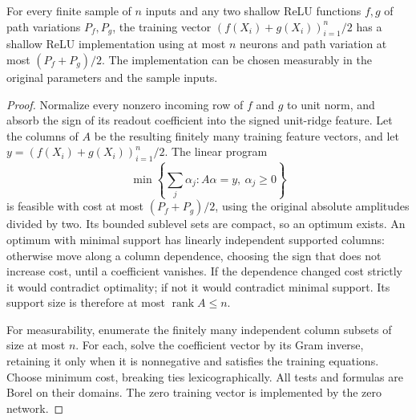 \begin{lemma}
For every finite sample of $n$ inputs and any two shallow ReLU
functions $f,g$ of path variations $P_f,P_g$, the training vector
$(f(X_i)+g(X_i))_{i=1}^n/2$ has a shallow ReLU implementation
using at most $n$ neurons and path variation at most $(P_f+P_g)/2$.
The implementation can be chosen measurably in the original
parameters and the sample inputs.
\end{lemma}
\begin{proof}
Normalize every nonzero incoming row of $f$ and $g$ to unit norm,
and absorb the sign of its readout coefficient into the signed
unit-ridge feature.
Let the columns of $A$ be the resulting finitely many training
feature vectors, and let $y=(f(X_i)+g(X_i))_{i=1}^n/2$.
The linear program
\[
 \min\left\{\sum_j\alpha_j:A\alpha=y,\ \alpha_j\ge0\right\}
\]
is feasible with cost at most $(P_f+P_g)/2$, using the original
absolute amplitudes divided by two. Its bounded sublevel sets are
compact, so an optimum exists. An optimum with minimal support has
linearly independent supported columns: otherwise move along a
column dependence, choosing the sign that does not increase cost,
until a coefficient vanishes. If the dependence changed cost
strictly it would contradict optimality; if not it would contradict
minimal support. Its support size is therefore at most
$\operatorname{rank}A\le n$.

For measurability, enumerate the finitely many independent column
subsets of size at most $n$. For each, solve the coefficient vector
by its Gram inverse, retaining it only when it is nonnegative and
satisfies the training equations. Choose minimum cost, breaking ties
lexicographically. All tests and formulas are Borel on their domains.
The zero training vector is implemented by the zero network.
\end{proof}

